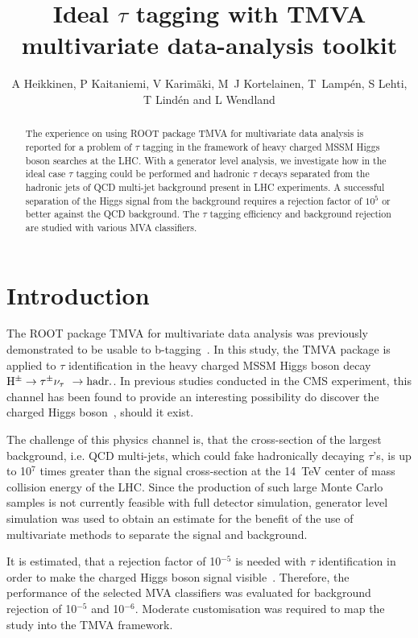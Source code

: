 \documentclass[a4paper]{jpconf}
\newcommand{\Hplustaunu}{\mbox{${\rm H}^{\pm} \to \tau^{\pm}\nu_{\tau}$}}
\begin{document}
\title{Ideal $\tau$ tagging with TMVA multivariate data-analysis toolkit}

\author{A Heikkinen, P Kaitaniemi, V Karim\"{a}ki,
M~J Kortelainen, T~Lamp\'{e}n, S Lehti, T Lind\'{e}n and L Wendland} 

\address{Helsinki Institute of Physics, P.O. Box 64, FIN-00014 University of Helsinki, Finland}



\begin{abstract}
The experience on using ROOT package TMVA for
multivariate data analysis is reported for a problem of $\tau$ tagging in the
framework of heavy charged MSSM Higgs boson searches at the LHC.
With a generator level analysis,
we investigate how in the ideal case $\tau$ tagging could be performed and
hadronic $\tau$ decays separated from the
hadronic jets of QCD multi-jet background present in LHC experiments.
A successful separation of the Higgs signal from the background
requires a rejection factor of $10^5$ or better against the QCD background.
The $\tau$ tagging efficiency and background rejection are studied with various MVA classifiers.
\end{abstract}


\section{Introduction}
The ROOT package TMVA for multivariate data analysis was previously demonstrated
to be usable to b-tagging~\cite{chep07tmva}. In this study, the TMVA
package is applied to $\tau$ identification in the heavy charged MSSM Higgs
boson decay \Hplustaunu~$\to {\rm hadr.}$. In previous studies
conducted in the CMS experiment, this channel has been found to
provide an interesting possibility do discover the charged Higgs
boson~\cite{ptdrII}, should it exist.

The challenge of this physics channel is, that the cross-section of
the largest background, i.e. QCD multi-jets, which could fake
hadronically decaying $\tau$'s, is up to 10$^7$ times
greater than the signal cross-section at the 14~TeV center of mass
collision energy of the LHC. 
Since the production of such large Monte Carlo samples is not
currently feasible with full detector simulation, generator level
simulation was used to obtain an estimate for the
benefit of the use of multivariate methods to separate the signal and
background.

It is estimated, that a rejection factor of 10$^{-5}$ is needed with
$\tau$ identification in order to make the charged Higgs boson signal
visible~\cite{ptdrII}. Therefore, the performance of the selected MVA
classifiers was evaluated for background rejection of 10$^{-5}$ and
10$^{-6}$. Moderate customisation was required to map the study into
the TMVA framework.
\end{document}
